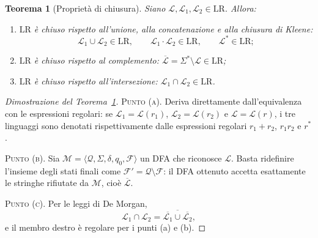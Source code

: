 \documentclass[a4paper, 11pt, oneside]{book}
\theoremstyle{formale}
\newtheorem{theorem}{Teorema}
\begin{document}
    \begin{theorem}[Propriet\`a di chiusura]
        \label{thm:chiusura}
        Siano $\mathcal{L}, \mathcal{L}_1, \mathcal{L}_2 \in \mathrm{LR}$. Allora:
        \begin{enumerate}[label=\textup{(\alph*)}]
            \item $\mathrm{LR}$ \`e chiuso rispetto all'unione, alla concatenazione e alla
                chiusura di Kleene:
                \begin{equation*}
                    \mathcal{L}_1 \cup \mathcal{L}_2 \in \mathrm{LR},
                    \qquad
                    \mathcal{L}_1 \cdot \mathcal{L}_2 \in \mathrm{LR},
                    \qquad
                    \mathcal{L}^* \in \mathrm{LR};
                \end{equation*}
            \item $\mathrm{LR}$ \`e chiuso rispetto al complemento:
                $\overline{\mathcal{L}} = \Sigma^* \setminus \mathcal{L} \in \mathrm{LR}$;
            \item $\mathrm{LR}$ \`e chiuso rispetto all'intersezione:
                $\mathcal{L}_1 \cap \mathcal{L}_2 \in \mathrm{LR}$.
        \end{enumerate}
    \end{theorem}

    \begin{proof}[Dimostrazione del Teorema~\ref{thm:chiusura}]
        \textsc{Punto (a)}. Deriva direttamente dall'equivalenza con le espressioni
        regolari: se $\mathcal{L}_1 = \mathcal{L}(r_1)$, $\mathcal{L}_2 = \mathcal{L}(r_2)$
        e $\mathcal{L} = \mathcal{L}(r)$, i tre linguaggi sono denotati rispettivamente
        dalle espressioni regolari $r_1 + r_2$, $r_1 r_2$ e $r^*$.

        \textsc{Punto (b)}. Sia $\mathcal{M} = \langle \mathcal{Q}, \Sigma, \delta, q_0,
        \mathcal{F} \rangle$ un DFA che riconosce $\mathcal{L}$. Basta ridefinire l'insieme
        degli stati finali come $\mathcal{F}' = \mathcal{Q} \setminus \mathcal{F}$: il DFA
        ottenuto accetta esattamente le stringhe rifiutate da $\mathcal{M}$, cio\`e
        $\overline{\mathcal{L}}$.

        \textsc{Punto (c)}. Per le leggi di De Morgan,
        \begin{equation*}
            \mathcal{L}_1 \cap \mathcal{L}_2
            = \overline{\overline{\mathcal{L}_1} \cup \overline{\mathcal{L}_2}},
        \end{equation*}
        e il membro destro \`e regolare per i punti (a) e (b).
    \end{proof}
\end{document}
